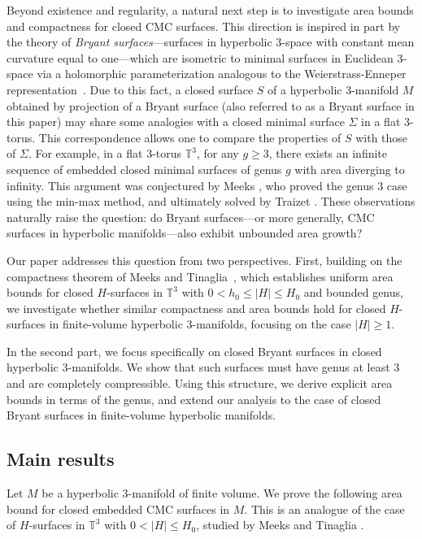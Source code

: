 \documentclass[12pt,a4paper]{amsart}
\numberwithin{equation}{section}
\theoremstyle{plain}
\theoremstyle{named}
\theoremstyle{definition}
\begin{document}
Beyond existence and regularity, a natural next step is to investigate area bounds and compactness for closed CMC surfaces. This direction is inspired in part by the theory of \emph{Bryant surfaces}---surfaces in hyperbolic $3$-space with constant mean curvature equal to one---which are isometric to minimal surfaces in Euclidean $3$-space via a holomorphic parameterization analogous to the Weierstrass-Enneper representation~\cite{Bryant}. Due to this fact, a closed surface $S$ of a hyperbolic $3$-manifold $M$ obtained by projection of a Bryant surface (also referred to as a Bryant surface in this paper) may share some analogies with a closed minimal surface $\Sigma$ in a flat $3$-torus. This correspondence allows one to compare the properties of $S$ with those of $\Sigma$. For example, in a flat $3$-torus $\mathbb{T}^3$, for any $g\geq 3$, there exists an infinite sequence of embedded closed minimal surfaces of genus $g$ with area diverging to infinity. This argument was conjectured by Meeks \cite{Meeks}, who proved the genus $3$ case using the min-max method, and ultimately solved by Traizet \cite{Traizet}. These observations naturally raise the question: do Bryant surfaces---or more generally, CMC surfaces in hyperbolic manifolds---also exhibit unbounded area growth?

Our paper addresses this question from two perspectives. First, building on the compactness theorem of Meeks and Tinaglia~\cite{Meeks-Tinaglia}, which establishes uniform area bounds for closed $H$-surfaces in $\mathbb{T}^3$ with $0 <h_0\leq |H|\leq H_0$ and bounded genus, we investigate whether similar compactness and area bounds hold for closed $H$-surfaces in finite-volume hyperbolic $3$-manifolds, focusing on the case $|H| \geq 1$.

In the second part, we focus specifically on closed Bryant surfaces in closed hyperbolic $3$-manifolds. We show that such surfaces must have genus at least $3$ and are completely compressible. Using this structure, we derive explicit area bounds in terms of the genus, and extend our analysis to the case of closed Bryant surfaces in finite-volume hyperbolic manifolds. 





\subsection{Main results}
Let $M$ be a hyperbolic 3-manifold of finite volume. We prove the following area bound for closed embedded CMC surfaces in $M$. This is an analogue of the case of $H$-surfaces in $\mathbb{T}^3$ with $0<|H|\leq H_0$, studied by Meeks and Tinaglia \cite{Meeks-Tinaglia}.
\end{document}

